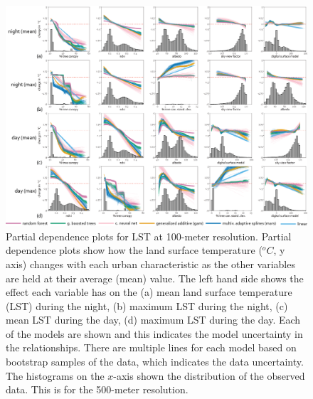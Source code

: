 \documentclass[review]{elsarticle}
\begin{document}
\begin{figure}
    \centering
    \includegraphics[width=\linewidth]{fig/report/pdp_100.png}
    \caption[Partial dependence plots for LST at 100-meter resolution]{
    Partial dependence plots for LST at 100-meter resolution.
    Partial dependence plots show how the land surface temperature ($^oC$, y axis) changes with each urban characteristic as the other variables are held at their average (mean) value. 
    The left hand side shows the effect each variable has on the (a) mean land surface temperature (LST) during the night, (b) maximum LST during the night, (c) mean LST during the day, (d) maximum LST during the day. 
    Each of the models are shown and this indicates the model uncertainty in the relationships.
    There are multiple lines for each model based on bootstrap samples of the data, which indicates the data uncertainty.
    The histograms on the $x$-axis shown the distribution of the observed data.
    This is for the 500-meter resolution.
    }
    \label{fig:pdp_100}
\end{figure}
\end{document}
